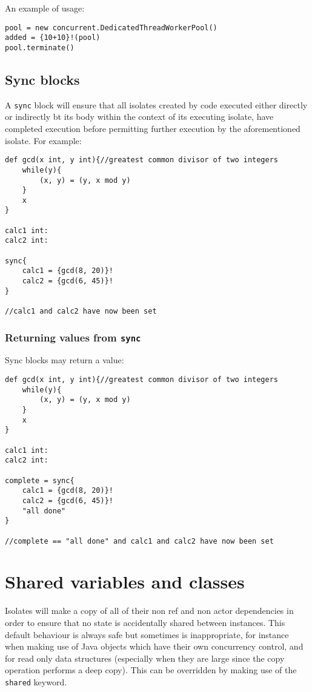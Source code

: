 \documentclass[conc-doc]{subfiles}
\begin{document}
An example of usage:

\begin{lstlisting}
pool = new concurrent.DedicatedThreadWorkerPool()
added = {10+10}!(pool)
pool.terminate()
\end{lstlisting}

\subsection{Sync blocks}
A \lstinline{sync} block will ensure that all isolates created by code executed either directly or indirectly bt its body within the context of its executing isolate, have completed execution before permitting further execution by the aforementioned isolate. For example:

\begin{lstlisting}
def gcd(x int, y int){//greatest common divisor of two integers
	while(y){
		(x, y) = (y, x mod y)
	}
	x
}

calc1 int:
calc2 int:

sync{
	calc1 = {gcd(8, 20)}!
	calc2 = {gcd(6, 45)}!
}

//calc1 and calc2 have now been set
\end{lstlisting}

\subsubsection{Returning values from \lstinline{sync}}
Sync blocks may return a value:

\begin{lstlisting}
def gcd(x int, y int){//greatest common divisor of two integers
	while(y){
		(x, y) = (y, x mod y)
	}
	x
}

calc1 int:
calc2 int:

complete = sync{
	calc1 = {gcd(8, 20)}!
	calc2 = {gcd(6, 45)}!
	"all done"
}

//complete == "all done" and calc1 and calc2 have now been set
\end{lstlisting}

\section{Shared variables and classes}
\label{sec:shared}
Isolates will make a copy of all of their non ref and non actor dependencies in order to ensure that no state is accidentally shared between instances. This default behaviour is always safe but sometimes is inappropriate, for instance when making use of Java objects which have their own concurrency control, and for read only data structures (especially when they are large since the copy operation performs a deep copy). This can be overridden by making use of the \lstinline{shared} keyword.
\end{document}

